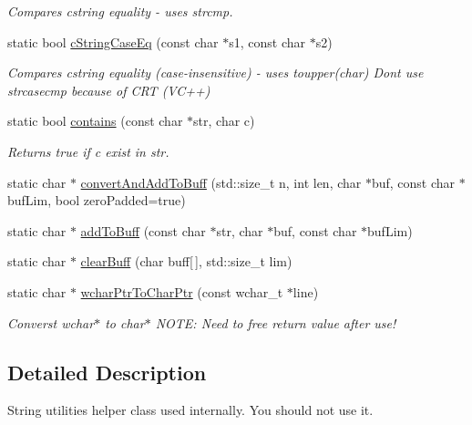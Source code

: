\begin{DoxyCompactItemize}
\begin{DoxyCompactList}\small\item\em Compares cstring equality -\/ uses strcmp. \end{DoxyCompactList}\item 
static bool \hyperlink{classel_1_1base_1_1utils_1_1_str_aaa37755d713b5e6475950134ce9ce0e8}{c\+String\+Case\+Eq} (const char $\ast$s1, const char $\ast$s2)
\begin{DoxyCompactList}\small\item\em Compares cstring equality (case-\/insensitive) -\/ uses toupper(char) Dont use strcasecmp because of C\+R\+T (V\+C++) \end{DoxyCompactList}\item 
static bool \hyperlink{classel_1_1base_1_1utils_1_1_str_a27cc1c1625b21597eb75df62b8fca0f8}{contains} (const char $\ast$str, char c)
\begin{DoxyCompactList}\small\item\em Returns true if c exist in str. \end{DoxyCompactList}\item 
static char $\ast$ \hyperlink{classel_1_1base_1_1utils_1_1_str_a5e12c163bf1085441ea5453fd6c62fa0}{convert\+And\+Add\+To\+Buff} (std\+::size\+\_\+t n, int len, char $\ast$buf, const char $\ast$buf\+Lim, bool zero\+Padded=true)
\item 
static char $\ast$ \hyperlink{classel_1_1base_1_1utils_1_1_str_aa6a96f625f71661c02ecd5366533abaa}{add\+To\+Buff} (const char $\ast$str, char $\ast$buf, const char $\ast$buf\+Lim)
\item 
static char $\ast$ \hyperlink{classel_1_1base_1_1utils_1_1_str_adf0c36c9b8276ede18111a866e31db8b}{clear\+Buff} (char buff\mbox{[}$\,$\mbox{]}, std\+::size\+\_\+t lim)
\item 
static char $\ast$ \hyperlink{classel_1_1base_1_1utils_1_1_str_a6dc022e7e8d4cbf2c80ba9e1354feaea}{wchar\+Ptr\+To\+Char\+Ptr} (const wchar\+\_\+t $\ast$line)
\begin{DoxyCompactList}\small\item\em Converst wchar$\ast$ to char$\ast$ N\+O\+T\+E\+: Need to free return value after use! \end{DoxyCompactList}\end{DoxyCompactItemize}


\subsection{Detailed Description}
String utilities helper class used internally. You should not use it. 

